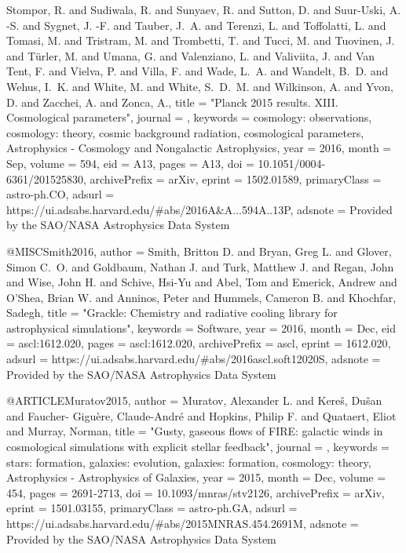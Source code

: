 {{        {Stompor}, R. and {Sudiwala}, R. and {Sunyaev}, R. and {Sutton},
        D. and {Suur-Uski}, A. -S. and {Sygnet}, J. -F. and {Tauber},
        J.~A. and {Terenzi}, L. and {Toffolatti}, L. and {Tomasi}, M.
        and {Tristram}, M. and {Trombetti}, T. and {Tucci}, M. and
        {Tuovinen}, J. and {T{\"u}rler}, M. and {Umana}, G. and
        {Valenziano}, L. and {Valiviita}, J. and {Van Tent}, F. and
        {Vielva}, P. and {Villa}, F. and {Wade}, L.~A. and {Wandelt},
        B.~D. and {Wehus}, I.~K. and {White}, M. and {White}, S.~D.~M.
        and {Wilkinson}, A. and {Yvon}, D. and {Zacchei}, A. and
        {Zonca}, A.},
        title = "{Planck 2015 results. XIII. Cosmological parameters}",
      journal = {\aap},
     keywords = {cosmology: observations, cosmology: theory, cosmic background radiation, cosmological parameters, Astrophysics - Cosmology and Nongalactic Astrophysics},
         year = 2016,
        month = Sep,
       volume = {594},
          eid = {A13},
        pages = {A13},
          doi = {10.1051/0004-6361/201525830},
archivePrefix = {arXiv},
       eprint = {1502.01589},
 primaryClass = {astro-ph.CO},
       adsurl = {https://ui.adsabs.harvard.edu/\#abs/2016A&A...594A..13P},
      adsnote = {Provided by the SAO/NASA Astrophysics Data System}
}

@MISC{Smith2016,
       author = {{Smith}, Britton D. and {Bryan}, Greg L. and {Glover}, Simon C.~O. and
        {Goldbaum}, Nathan J. and {Turk}, Matthew J. and {Regan}, John
        and {Wise}, John H. and {Schive}, Hsi-Yu and {Abel}, Tom and
        {Emerick}, Andrew and {O'Shea}, Brian W. and {Anninos}, Peter
        and {Hummels}, Cameron B. and {Khochfar}, Sadegh},
        title = "{Grackle: Chemistry and radiative cooling library for astrophysical simulations}",
     keywords = {Software},
         year = 2016,
        month = Dec,
          eid = {ascl:1612.020},
        pages = {ascl:1612.020},
archivePrefix = {ascl},
       eprint = {1612.020},
       adsurl = {https://ui.adsabs.harvard.edu/\#abs/2016ascl.soft12020S},
      adsnote = {Provided by the SAO/NASA Astrophysics Data System}
}

@ARTICLE{Muratov2015,
       author = {{Muratov}, Alexander L. and {Kere{\v{s}}}, Du{\v{s}}an and {Faucher-
        Gigu{\`e}re}, Claude-Andr{\'e} and {Hopkins}, Philip F. and
        {Quataert}, Eliot and {Murray}, Norman},
        title = "{Gusty, gaseous flows of FIRE: galactic winds in cosmological simulations with explicit stellar feedback}",
      journal = {\mnras},
     keywords = {stars: formation, galaxies: evolution, galaxies: formation, cosmology: theory, Astrophysics - Astrophysics of Galaxies},
         year = 2015,
        month = Dec,
       volume = {454},
        pages = {2691-2713},
          doi = {10.1093/mnras/stv2126},
archivePrefix = {arXiv},
       eprint = {1501.03155},
 primaryClass = {astro-ph.GA},
       adsurl = {https://ui.adsabs.harvard.edu/\#abs/2015MNRAS.454.2691M},
      adsnote = {Provided by the SAO/NASA Astrophysics Data System}
}

